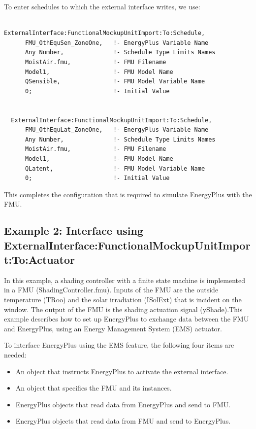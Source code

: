 To enter schedules to which the external interface writes, we use:

\begin{lstlisting}

ExternalInterface:FunctionalMockupUnitImport:To:Schedule,
      FMU_OthEquSen_ZoneOne,   !- EnergyPlus Variable Name
      Any Number,              !- Schedule Type Limits Names
      MoistAir.fmu,            !- FMU Filename
      Model1,                  !- FMU Model Name
      QSensible,               !- FMU Model Variable Name
      0;                       !- Initial Value


  ExternalInterface:FunctionalMockupUnitImport:To:Schedule,
      FMU_OthEquLat_ZoneOne,   !- EnergyPlus Variable Name
      Any Number,              !- Schedule Type Limits Names
      MoistAir.fmu,            !- FMU Filename
      Model1,                  !- FMU Model Name
      QLatent,                 !- FMU Model Variable Name
      0;                       !- Initial Value
\end{lstlisting}

This completes the configuration that is required to simulate EnergyPlus with the FMU.

\subsection{Example 2: Interface using ExternalInterface:FunctionalMockupUnitImport:To:Actuator}\label{example-2-interface-using-externalinterfacefunctionalmockupunitimporttoactuator}

In this example, a shading controller with a finite state machine is implemented in a FMU (ShadingController.fmu). Inputs of the FMU are the outside temperature (TRoo) and the solar irradiation (ISolExt) that is incident on the window. The output of the FMU is the shading actuation signal (yShade).This example describes how to set up EnergyPlus to exchange data between the FMU and EnergyPlus, using an Energy Management System (EMS) actuator.

To interface EnergyPlus using the EMS feature, the following four items are needed:

\begin{itemize}
\item
  An object that instructs EnergyPlus to activate the external interface.
\item
  An object that specifies the FMU and its instances.
\item
  EnergyPlus objects that read data from EnergyPlus and send to FMU.
\item
  EnergyPlus objects that read data from FMU and send to EnergyPlus.
\end{itemize}

